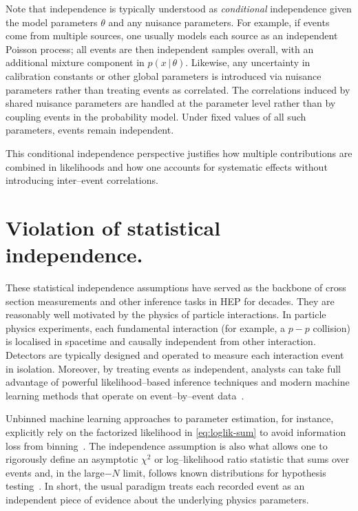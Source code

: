         Note that independence is typically understood as \emph{conditional} independence given the model parameters $\theta$ and any nuisance parameters.
        For example, if events come from multiple sources, one usually models each source as an independent Poisson process; all events are then independent samples overall, with an additional mixture component in $p(x\,|\,\theta)$.
        Likewise, any uncertainty in calibration constants or other global parameters is introduced via nuisance parameters rather than treating events as correlated.
        The correlations induced by shared nuisance parameters are handled at the parameter level rather than by coupling events in the probability model.
        Under fixed values of all such parameters, events remain independent.
        
        This conditional independence perspective justifies how multiple contributions are combined in likelihoods and how one accounts for systematic effects without introducing inter--event correlations.
\section{Violation of statistical independence.}
    \label{sec:violation-of-statistical-independence}
    These statistical independence assumptions have served as the backbone of cross section measurements and other inference tasks in HEP for decades.
    They are reasonably well motivated by the physics of particle interactions.
    In particle physics experiments, each fundamental interaction (for example, a \(p-p\) collision) is localised in spacetime and causally independent from other interaction.
    Detectors are typically designed and operated to measure each interaction event in isolation.
    Moreover, by treating events as independent, analysts can take full advantage of powerful likelihood--based inference techniques and modern machine learning methods that operate on event--by--event data~\cite{GomezAmbrosio:2022mpm, mishra-sharma_smsharmaawesome-neural-sbi_2025, noauthor_simulation-based-inferencesimulation-based-inferencegithubio_2025}.
    
    Unbinned machine learning approaches to parameter estimation, for instance, explicitly rely on the factorized likelihood in \cref{eq:loglik-sum} to avoid information loss from binning~\cite{GomezAmbrosio:2022mpm, Arratia:2021otl, du_unifying_2024}.
    The independence assumption is also what allows one to rigorously define an asymptotic $\chi^2$ or log--likelihood ratio statistic that sums over events and, in the large$-N$ limit, follows known distributions for hypothesis testing~\cite{Canonero:2023sua, Letizia:2022xbe, du_unifying_2024}.
    In short, the usual paradigm treats each recorded event as an independent piece of evidence about the underlying physics parameters.

